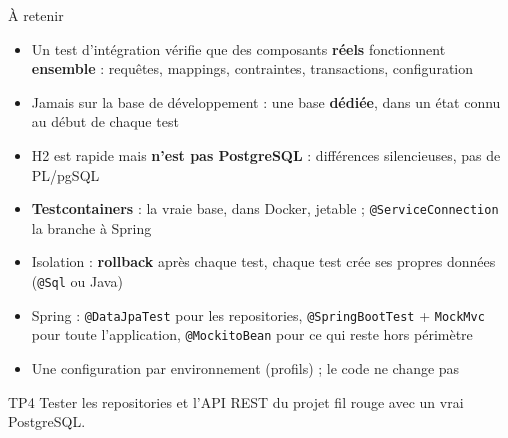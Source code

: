 \documentclass[aspectratio=169,10pt]{beamer}
\begin{document}
\begin{frame}{À retenir}
  \small
  \begin{itemize}
    \item Un test d'intégration vérifie que des composants \textbf{réels} fonctionnent \textbf{ensemble} : requêtes, mappings, contraintes, transactions, configuration
    \item Jamais sur la base de développement : une base \textbf{dédiée}, dans un état connu au début de chaque test
    \item H2 est rapide mais \textbf{n'est pas PostgreSQL} : différences silencieuses, pas de PL/pgSQL
    \item \textbf{Testcontainers} : la vraie base, dans Docker, jetable ; \texttt{@ServiceConnection} la branche à Spring
    \item Isolation : \textbf{rollback} après chaque test, chaque test crée ses propres données (\texttt{@Sql} ou Java)
    \item Spring : \texttt{@DataJpaTest} pour les repositories, \texttt{@SpringBootTest} + \texttt{MockMvc} pour toute l'application, \texttt{@MockitoBean} pour ce qui reste hors périmètre
    \item Une configuration par environnement (profils) ; le code ne change pas
  \end{itemize}
  \vspace{1mm}
  \begin{exampleblock}{TP4}
    Tester les repositories et l'API REST du projet fil rouge avec un vrai PostgreSQL.
  \end{exampleblock}
\end{frame}

\rquestionslide
\end{document}
